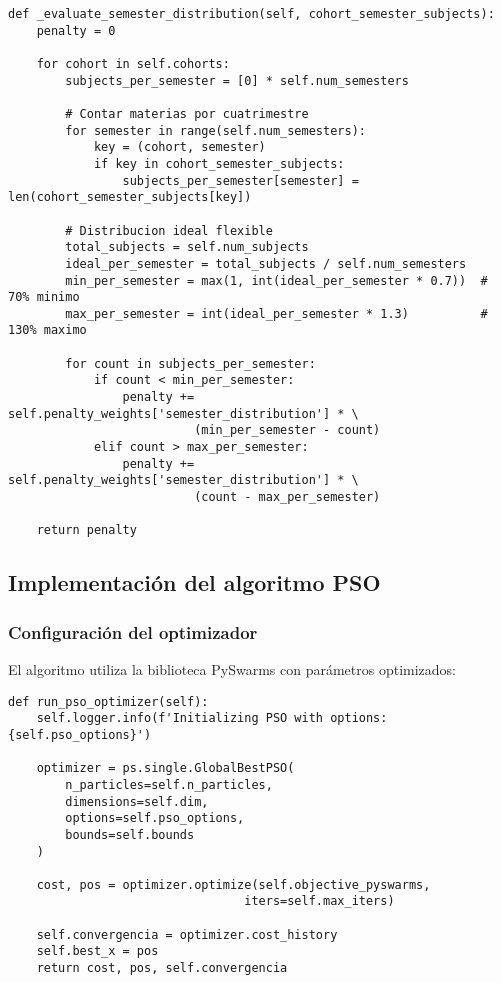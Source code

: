 \begin{verbatim}
def _evaluate_semester_distribution(self, cohort_semester_subjects):
    penalty = 0
    
    for cohort in self.cohorts:
        subjects_per_semester = [0] * self.num_semesters
        
        # Contar materias por cuatrimestre
        for semester in range(self.num_semesters):
            key = (cohort, semester)
            if key in cohort_semester_subjects:
                subjects_per_semester[semester] = len(cohort_semester_subjects[key])
        
        # Distribucion ideal flexible
        total_subjects = self.num_subjects
        ideal_per_semester = total_subjects / self.num_semesters
        min_per_semester = max(1, int(ideal_per_semester * 0.7))  # 70% minimo
        max_per_semester = int(ideal_per_semester * 1.3)          # 130% maximo
        
        for count in subjects_per_semester:
            if count < min_per_semester:
                penalty += self.penalty_weights['semester_distribution'] * \
                          (min_per_semester - count)
            elif count > max_per_semester:
                penalty += self.penalty_weights['semester_distribution'] * \
                          (count - max_per_semester)
    
    return penalty
\end{verbatim}

\subsection{Implementación del algoritmo PSO}

\subsubsection{Configuración del optimizador}
El algoritmo utiliza la biblioteca PySwarms con parámetros optimizados:

\begin{verbatim}
def run_pso_optimizer(self):
    self.logger.info(f'Initializing PSO with options: {self.pso_options}')
    
    optimizer = ps.single.GlobalBestPSO(
        n_particles=self.n_particles,
        dimensions=self.dim,
        options=self.pso_options,
        bounds=self.bounds
    )
    
    cost, pos = optimizer.optimize(self.objective_pyswarms, 
                                 iters=self.max_iters)
    
    self.convergencia = optimizer.cost_history
    self.best_x = pos
    return cost, pos, self.convergencia
\end{verbatim}

